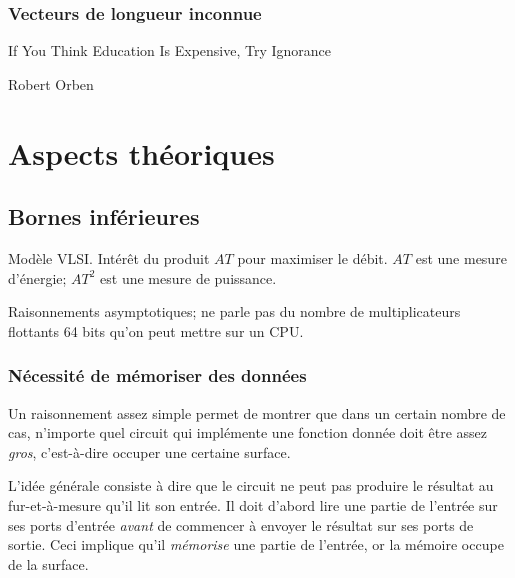 \section{Vecteurs de longueur inconnue}

\epigraph{If You Think Education Is Expensive, Try Ignorance}{Robert Orben}





\part{Aspects théoriques}

\chapter{Bornes inférieures}

Modèle VLSI. Intérêt du produit $AT$ pour maximiser le débit. $AT$ est une
mesure d'énergie; $AT^2$ est une mesure de puissance.

Raisonnements asymptotiques; ne parle pas du nombre de multiplicateurs flottants
64 bits qu'on peut mettre sur un CPU.

\section{Nécessité de mémoriser des données}

Un raisonnement assez simple permet de montrer que dans un certain nombre de
cas, n'importe quel circuit qui implémente une fonction donnée doit être assez
\emph{gros}, c'est-à-dire occuper une certaine surface.

L'idée générale consiste à dire que le circuit ne peut pas produire le résultat
au fur-et-à-mesure qu'il lit son entrée. Il doit d'abord lire une partie de
l'entrée sur ses ports d'entrée \emph{avant} de commencer à envoyer le résultat
sur ses ports de sortie. Ceci implique qu'il \emph{mémorise} une partie de
l'entrée, or la mémoire occupe de la surface.

